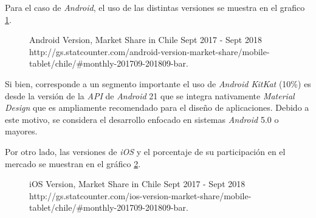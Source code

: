 Para el caso de \emph{Android}, el uso de las distintas versiones se muestra en el grafico \ref{chart:Android Version}.

\begin{figure}[H]
	\centering
	\caption[Android Version, Market Share in Chile Sept 2017 - Sept 2018.]{Android Version, Market Share in Chile Sept 2017 - Sept 2018 \\ http://gs.statcounter.com/android-version-market-share/mobile-tablet/chile/\#monthly-201709-201809-bar.}
	\label{chart:Android Version}
	\begin{bchart}[step=10, max=100, width=.7\textwidth, unit=\%]
	\end{bchart}
\end{figure}

Si bien, corresponde a un segmento importante el uso de \emph{Android KitKat} (10\%) es desde la versión de la \emph{API} de \emph{Android} 21 que se integra nativamente \emph{Material Design} que es ampliamente recomendado para el diseño de aplicaciones.  Debido a este motivo, se considera el desarrollo enfocado en sistemas \emph{Android} 5.0 o mayores.

Por otro lado, las versiones de \emph{iOS} y el porcentaje de su participación en el mercado se muestran en el gráfico \ref{chart:iOS Version}.

\begin{figure}[H]
	\centering
	\caption[iOS Version, Market Share in Chile Sept 2017 - Sept 2018.]{iOS Version, Market Share in Chile Sept 2017 - Sept 2018 \\ http://gs.statcounter.com/ios-version-market-share/mobile-tablet/chile/\#monthly-201709-201809-bar.}
	\label{chart:iOS Version}
	\begin{bchart}[step=10, max=100, width=.8\textwidth, unit=\%]
	\end{bchart}
\end{figure}

